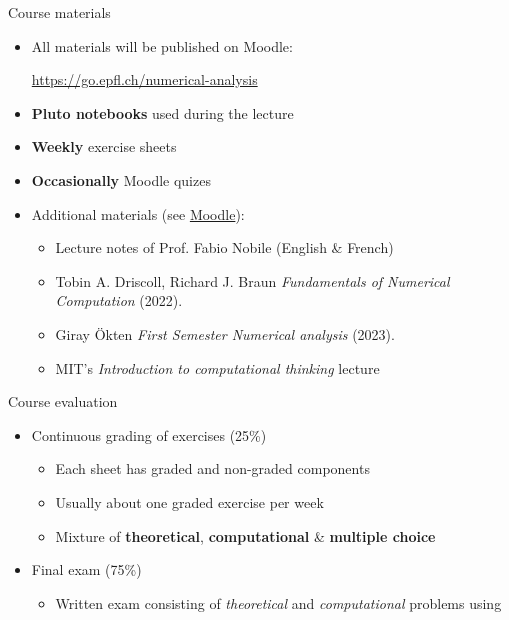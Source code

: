\begin{frame}{Course materials}
    \begin{itemize}
        \item All materials will be published on \alert{Moodle:}
            \begin{center}
            \url{https://go.epfl.ch/numerical-analysis}
            \end{center}
        \vspace{1em}
        \item \textbf{Pluto notebooks} used during the lecture
        \item \textbf{Weekly} exercise sheets
        \item \textbf{Occasionally} Moodle quizes
        \vspace{1em}
        \item Additional materials (see \href{https://go.epfl.ch/numerical-analysis}{Moodle}):
            \begin{itemize}
                \item Lecture notes of Prof. Fabio Nobile (English \& French)
                \item Tobin A. Driscoll, Richard J. Braun
                    \textit{Fundamentals of Numerical Computation} (2022).
                \item Giray Ökten \textit{First Semester Numerical analysis} (2023).
                \item MIT's \textit{Introduction to computational thinking} lecture
            \end{itemize}
    \end{itemize}
\end{frame}


\begin{frame}{Course evaluation}
    \begin{itemize}
        \item Continuous grading of exercises \alert{(25\%)}
            \begin{itemize}
                \item Each sheet has graded and non-graded components
                \item Usually about one graded exercise per week
                \item Mixture of \textbf{theoretical}, \textbf{computational}
                    \& \textbf{multiple choice}
            \end{itemize}
        \vspace{2em}
        \item Final exam \alert{(75\%)}
            \begin{itemize}
                \item \alert{Written exam} %
                    consisting of \textit{theoretical} and \textit{computational}
                    problems using \julia
            \end{itemize}
    \end{itemize}
\end{frame}

